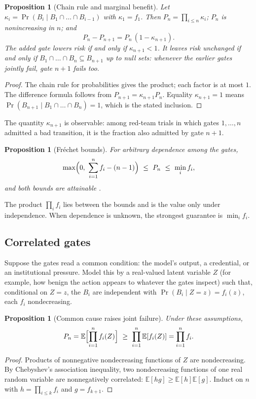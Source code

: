 \documentclass[11pt]{article}
\newtheorem{proposition}[theorem]{Proposition}
\theoremstyle{definition}
\begin{document}
\begin{proposition}[Chain rule and marginal benefit]\label{prop:E1}
Let $\kappa_i=\Pr(B_i\mid B_1\cap\dots\cap B_{i-1})$ with $\kappa_1=f_1$. Then $P_n=\prod_{i\le n}\kappa_i$; $P_n$ is nonincreasing in $n$; and
\[
P_n-P_{n+1}=P_n\,(1-\kappa_{n+1}).
\]
The added gate lowers risk if and only if $\kappa_{n+1}<1$. It leaves risk unchanged if and only if $B_1\cap\dots\cap B_n\subseteq B_{n+1}$ up to null sets: whenever the earlier gates jointly fail, gate $n+1$ fails too.
\end{proposition}
\begin{proof}
The chain rule for probabilities gives the product; each factor is at most $1$. The difference formula follows from $P_{n+1}=\kappa_{n+1}P_n$. Equality $\kappa_{n+1}=1$ means $\Pr(B_{n+1}\mid B_1\cap\dots\cap B_n)=1$, which is the stated inclusion.
\end{proof}

The quantity $\kappa_{n+1}$ is observable: among red-team trials in which gates $1,\dots,n$ admitted a bad transition, it is the fraction also admitted by gate $n+1$.

\begin{proposition}[Fr\'echet bounds]\label{prop:E2}
For arbitrary dependence among the gates,
\[
\max\Bigl(0,\ \sum_{i=1}^nf_i-(n-1)\Bigr)\ \le\ P_n\ \le\ \min_if_i,
\]
and both bounds are attainable \cite{frechet1951}.
\end{proposition}

The product $\prod_if_i$ lies between the bounds and is the value only under independence. When dependence is unknown, the strongest guarantee is $\min_if_i$.

\subsection{Correlated gates}

Suppose the gates read a common condition: the model's output, a credential, or an institutional pressure. Model this by a real-valued latent variable $Z$ (for example, how benign the action appears to whatever the gates inspect) such that, conditional on $Z=z$, the $B_i$ are independent with $\Pr(B_i\mid Z=z)=f_i(z)$, each $f_i$ nondecreasing.

\begin{proposition}[Common cause raises joint failure]\label{prop:E3}
Under these assumptions,
\[
P_n=\mathbb{E}\Bigl[\prod_{i=1}^nf_i(Z)\Bigr]\ \ge\ \prod_{i=1}^n\mathbb{E}[f_i(Z)]=\prod_{i=1}^nf_i .
\]
\end{proposition}
\begin{proof}
Products of nonnegative nondecreasing functions of $Z$ are nondecreasing. By Chebyshev's association inequality, two nondecreasing functions of one real random variable are nonnegatively correlated: $\mathbb{E}[hg]\ge\mathbb{E}[h]\mathbb{E}[g]$. Induct on $n$ with $h=\prod_{i\le k}f_i$ and $g=f_{k+1}$.
\end{proof}
\end{document}
